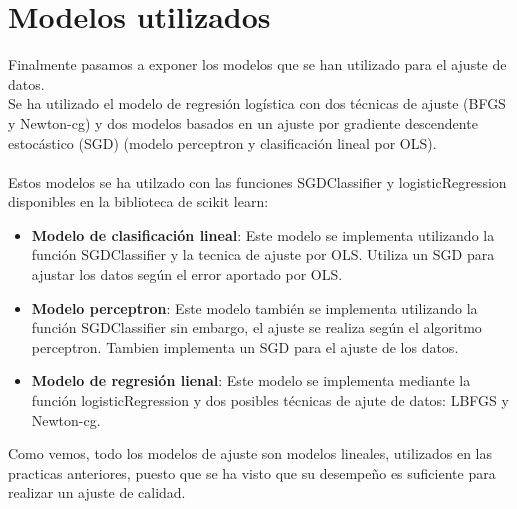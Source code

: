 \section{Modelos utilizados}
Finalmente pasamos a exponer los modelos que se han utilizado para el ajuste de datos.
\\Se ha utilizado el modelo de regresión logística con dos técnicas de ajuste (BFGS y Newton-cg) y dos modelos basados en un ajuste por gradiente descendente estocástico (SGD) (modelo perceptron y clasificación lineal por OLS).
\\\\
Estos modelos se ha utilzado con las funciones SGDClassifier\cite{SGDClassifier} y  logisticRegression\cite{logisticRegression} disponibles en la biblioteca de scikit learn:
\begin{itemize}
   \item \textbf{Modelo de clasificación lineal}: Este modelo se implementa utilizando la función SGDClassifier y la tecnica de ajuste por OLS. Utiliza un SGD para ajustar los datos según el error aportado por OLS.
   \item \textbf{Modelo perceptron}: Este modelo también se implementa utilizando la función SGDClassifier sin embargo, el ajuste se realiza según el algoritmo perceptron. Tambien implementa un SGD para el ajuste de los datos.
   \item \textbf{Modelo de regresión lienal}: Este modelo se implementa mediante la función logisticRegression y dos posibles técnicas de ajute de datos: LBFGS y Newton-cg.
\end{itemize}
Como vemos, todo los modelos de ajuste son modelos lineales, utilizados en las practicas anteriores, puesto que se ha visto que su desempeño es suficiente para realizar un ajuste de calidad.

